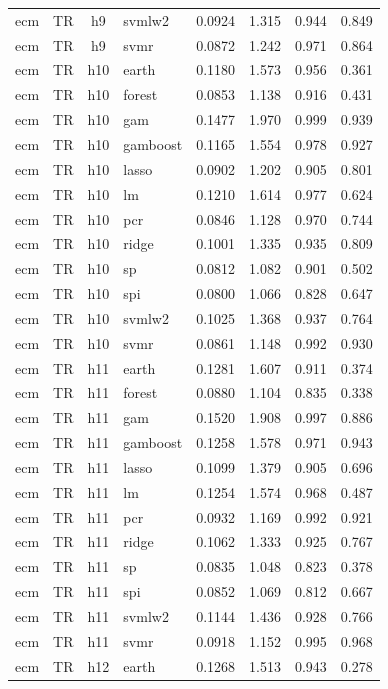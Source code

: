 \begin{ThreePartTable}
\begin{longtable}[t]{llclcccc}
ecm & TR & h9 & svmlw2 & 0.0924 & 1.315 & 0.944 & 0.849\\
ecm & TR & h9 & svmr & 0.0872 & 1.242 & 0.971 & 0.864\\
\addlinespace
ecm & TR & h10 & earth & 0.1180 & 1.573 & 0.956 & 0.361\\
ecm & TR & h10 & forest & 0.0853 & 1.138 & 0.916 & 0.431\\
ecm & TR & h10 & gam & 0.1477 & 1.970 & 0.999 & 0.939\\
ecm & TR & h10 & gamboost & 0.1165 & 1.554 & 0.978 & 0.927\\
ecm & TR & h10 & lasso & 0.0902 & 1.202 & 0.905 & 0.801\\
ecm & TR & h10 & lm & 0.1210 & 1.614 & 0.977 & 0.624\\
ecm & TR & h10 & pcr & 0.0846 & 1.128 & 0.970 & 0.744\\
ecm & TR & h10 & ridge & 0.1001 & 1.335 & 0.935 & 0.809\\
ecm & TR & h10 & sp & 0.0812 & 1.082 & 0.901 & 0.502\\
ecm & TR & h10 & spi & 0.0800 & 1.066 & 0.828 & 0.647\\
ecm & TR & h10 & svmlw2 & 0.1025 & 1.368 & 0.937 & 0.764\\
ecm & TR & h10 & svmr & 0.0861 & 1.148 & 0.992 & 0.930\\
\addlinespace
ecm & TR & h11 & earth & 0.1281 & 1.607 & 0.911 & 0.374\\
ecm & TR & h11 & forest & 0.0880 & 1.104 & 0.835 & 0.338\\
ecm & TR & h11 & gam & 0.1520 & 1.908 & 0.997 & 0.886\\
ecm & TR & h11 & gamboost & 0.1258 & 1.578 & 0.971 & 0.943\\
ecm & TR & h11 & lasso & 0.1099 & 1.379 & 0.905 & 0.696\\
ecm & TR & h11 & lm & 0.1254 & 1.574 & 0.968 & 0.487\\
ecm & TR & h11 & pcr & 0.0932 & 1.169 & 0.992 & 0.921\\
ecm & TR & h11 & ridge & 0.1062 & 1.333 & 0.925 & 0.767\\
ecm & TR & h11 & sp & 0.0835 & 1.048 & 0.823 & 0.378\\
ecm & TR & h11 & spi & 0.0852 & 1.069 & 0.812 & 0.667\\
ecm & TR & h11 & svmlw2 & 0.1144 & 1.436 & 0.928 & 0.766\\
ecm & TR & h11 & svmr & 0.0918 & 1.152 & 0.995 & 0.968\\
\addlinespace
ecm & TR & h12 & earth & 0.1268 & 1.513 & 0.943 & 0.278\\

\end{longtable}
\end{ThreePartTable}
